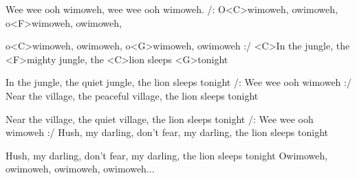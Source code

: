
\zs
Wee wee ooh wimoweh,
wee wee ooh wimoweh.
\ks
\zr
/: O<C>wimoweh, owimoweh, o<F>wimoweh, owimoweh,

o<C>wimoweh, owimoweh, o<G>wimoweh, owimoweh :/
\kr
\zs
<C>In the jungle, the <F>mighty jungle, the <C>lion sleeps <G>tonight

In the jungle, the quiet jungle, the lion sleeps tonight
\ks
\zr
/: Wee wee ooh wimoweh :/
\kr
\zs
Near the village, the peaceful village, the lion sleeps tonight

Near the village, the quiet village, the lion sleeps tonight
\ks
\zr
/: Wee wee ooh wimoweh :/
\kr
\zs
Hush, my darling, don’t fear, my darling, the lion sleeps tonight

Hush, my darling, don’t fear, my darling, the lion sleeps tonight
\ks
\zr
Owimoweh, owimoweh, owimoweh, owimoweh...
\kr
\kp




